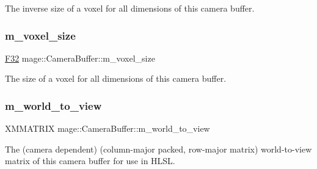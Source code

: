 The inverse size of a voxel for all dimensions of this camera buffer. \hypertarget{structmage_1_1_camera_buffer_a19c4cc07e7c138df4cd31b506ab86289}{}\label{structmage_1_1_camera_buffer_a19c4cc07e7c138df4cd31b506ab86289} 
\subsubsection{\texorpdfstring{m\+\_\+voxel\+\_\+size}{m\_voxel\_size}}
{\footnotesize\ttfamily \hyperlink{namespacemage_aa97e833b45f06d60a0a9c4fc22ae02c0}{F32} mage\+::\+Camera\+Buffer\+::m\+\_\+voxel\+\_\+size}

The size of a voxel for all dimensions of this camera buffer. \hypertarget{structmage_1_1_camera_buffer_a28db697d7da502479b3e29752122c9f4}{}\label{structmage_1_1_camera_buffer_a28db697d7da502479b3e29752122c9f4} 
\subsubsection{\texorpdfstring{m\+\_\+world\+\_\+to\+\_\+view}{m\_world\_to\_view}}
{\footnotesize\ttfamily X\+M\+M\+A\+T\+R\+IX mage\+::\+Camera\+Buffer\+::m\+\_\+world\+\_\+to\+\_\+view}

The (camera dependent) (column-\/major packed, row-\/major matrix) world-\/to-\/view matrix of this camera buffer for use in H\+L\+SL. 